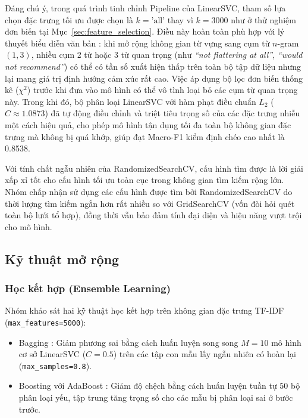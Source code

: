 Đáng chú ý, trong quá trình tinh chỉnh Pipeline của LinearSVC, tham số lựa chọn đặc trưng tối ưu được chọn là $k=\text{'all'}$ thay vì $k=3000$ như ở thử nghiệm đơn biến tại Mục~\ref{sec:feature_selection}. Điều này hoàn toàn phù hợp với lý thuyết biểu diễn văn bản \cite{wang2012, joachims1998}: khi mở rộng không gian từ vựng sang cụm từ $n$-gram $(1, 3)$, nhiều cụm 2 từ hoặc 3 từ quan trọng (như \textit{``not flattering at all''}, \textit{``would not recommend''}) có thể có tần số xuất hiện thấp trên toàn bộ tập dữ liệu nhưng lại mang giá trị định hướng cảm xúc rất cao. Việc áp dụng bộ lọc đơn biến thống kê ($\chi^2$) trước khi đưa vào mô hình có thể vô tình loại bỏ các cụm từ quan trọng này. Trong khi đó, bộ phân loại LinearSVC với hàm phạt điều chuẩn $L_2$ ($C \approx 1.0873$) đã tự động điều chỉnh và triệt tiêu trọng số của các đặc trưng nhiễu một cách hiệu quả, cho phép mô hình tận dụng tối đa toàn bộ không gian đặc trưng mà không bị quá khớp, giúp đạt Macro-F1 kiểm định chéo cao nhất là 0.8538.

Với tính chất ngẫu nhiên của RandomizedSearchCV, cấu hình tìm được là lời giải xấp xỉ tốt cho cấu hình tối ưu toàn cục trong không gian tìm kiếm rộng lớn. Nhóm chấp nhận sử dụng các cấu hình được tìm bởi RandomizedSearchCV do thời lượng tìm kiếm ngắn hơn rất nhiều so với GridSearchCV (vốn đòi hỏi quét toàn bộ lưới tổ hợp), đồng thời vẫn bảo đảm tính đại diện và hiệu năng vượt trội cho mô hình.

\subsection{Kỹ thuật mở rộng}

\subsubsection{Học kết hợp (Ensemble Learning)}

Nhóm khảo sát hai kỹ thuật học kết hợp trên không gian đặc trưng TF-IDF (\texttt{max\_features=5000}):
\begin{itemize}
    \item Bagging \cite{breiman1996}: Giảm phương sai bằng cách huấn luyện song song $M=10$ mô hình cơ sở LinearSVC ($C=0.5$) trên các tập con mẫu lấy ngẫu nhiên có hoàn lại (\texttt{max\_samples=0.8}).
    \item Boosting với AdaBoost \cite{freund1997}: Giảm độ chệch bằng cách huấn luyện tuần tự $50$ bộ phân loại yếu, tập trung tăng trọng số cho các mẫu bị phân loại sai ở bước trước.
\end{itemize}

